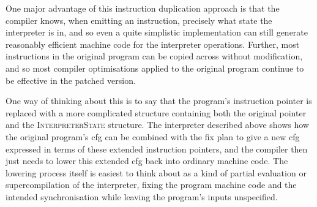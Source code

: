 One major advantage of this instruction duplication approach is that
the compiler knows, when emitting an instruction, precisely what state
the interpreter is in, and so even a quite simplistic implementation
can still generate reasonably efficient machine code for the
interpreter operations.  Further, most instructions in the original
program can be copied across without modification, and so most
compiler optimisations applied to the original program continue to be
effective in the patched version.

One way of thinking about this is to say that the program's
instruction pointer is replaced with a more complicated structure
containing both the original pointer and the \textsc{InterpreterState}
structure.  The interpreter described above shows how the original
program's \gls{cfg} can be combined with the fix plan to give a new
\gls{cfg} expressed in terms of these extended instruction pointers,
and the compiler then just needs to lower this extended \gls{cfg} back
into ordinary machine code.  The lowering process itself is easiest to
think about as a kind of partial evaluation\cite{Jones1993} or
supercompilation\cite{Sorensen2008} of the interpreter, fixing the
program machine code and the intended synchronisation while leaving
the program's inputs unspecified.
